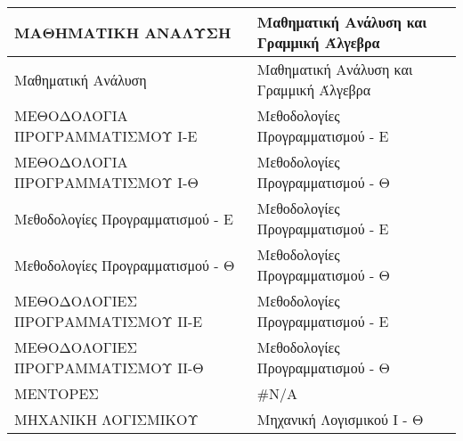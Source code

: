 \documentclass[12pt,a4paper,final]{article}
\begin{document}
\begin{landscape}
\begin{center}
\begin{longtable}{|l|l|}
\hline
ΜΑΘΗΜΑΤΙΚΗ ΑΝΑΛΥΣΗ                                                                                              & Μαθηματική Ανάλυση και Γραμμική Άλγεβρα                                                                              \\ 
\hline
Μαθηματική Ανάλυση                                                                                              & Μαθηματική Ανάλυση και Γραμμική Άλγεβρα                                                                              \\ 
\hline
ΜΕΘΟΔΟΛΟΓΙΑ ΠΡΟΓΡΑΜΜΑΤΙΣΜΟΥ Ι-Ε                                                                                 & Μεθοδολογίες Προγραμματισμού - Ε                                                                                     \\ 
\hline
ΜΕΘΟΔΟΛΟΓΙΑ ΠΡΟΓΡΑΜΜΑΤΙΣΜΟΥ Ι-Θ                                                                                 & Μεθοδολογίες Προγραμματισμού - Θ                                                                                     \\ 
\hline
Μεθοδολογίες Προγραμματισμού - Ε                                                                                & Μεθοδολογίες Προγραμματισμού - Ε                                                                                     \\ 
\hline
Μεθοδολογίες Προγραμματισμού - Θ                                                                                & Μεθοδολογίες Προγραμματισμού - Θ                                                                                     \\ 
\hline
ΜΕΘΟΔΟΛΟΓΙΕΣ ΠΡΟΓΡΑΜΜΑΤΙΣΜΟΥ ΙΙ-Ε                                                                               & Μεθοδολογίες Προγραμματισμού - Ε                                                                                     \\ 
\hline
ΜΕΘΟΔΟΛΟΓΙΕΣ ΠΡΟΓΡΑΜΜΑΤΙΣΜΟΥ ΙΙ-Θ                                                                               & Μεθοδολογίες Προγραμματισμού - Θ                                                                                     \\ 
\hline
ΜΕΝΤΟΡΕΣ                                                                                                        & \#N/A                                                                                                                \\ 
\hline
ΜΗΧΑΝΙΚΗ ΛΟΓΙΣΜΙΚΟΥ                                                                                             & Μηχανική Λογισμικού Ι - Θ                                                                                            \\ 

\end{longtable}
\end{center}
\end{landscape}
\end{document}
